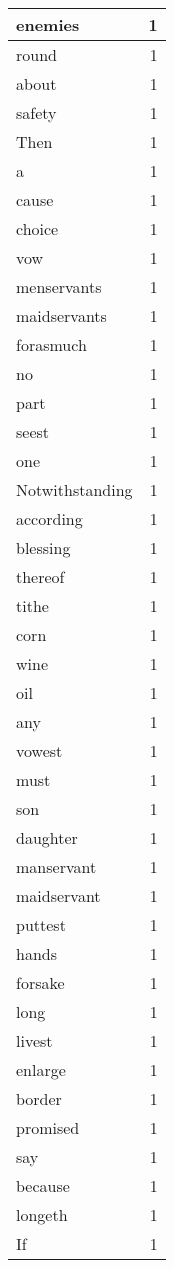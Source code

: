 \begin{center}
\begin{longtable}{l|r}
enemies & 1 \\ \hline
round & 1 \\ \hline
about & 1 \\ \hline
safety & 1 \\ \hline
Then & 1 \\ \hline
a & 1 \\ \hline
cause & 1 \\ \hline
choice & 1 \\ \hline
vow & 1 \\ \hline
menservants & 1 \\ \hline
maidservants & 1 \\ \hline
forasmuch & 1 \\ \hline
no & 1 \\ \hline
part & 1 \\ \hline
seest & 1 \\ \hline
one & 1 \\ \hline
Notwithstanding & 1 \\ \hline
according & 1 \\ \hline
blessing & 1 \\ \hline
thereof & 1 \\ \hline
tithe & 1 \\ \hline
corn & 1 \\ \hline
wine & 1 \\ \hline
oil & 1 \\ \hline
any & 1 \\ \hline
vowest & 1 \\ \hline
must & 1 \\ \hline
son & 1 \\ \hline
daughter & 1 \\ \hline
manservant & 1 \\ \hline
maidservant & 1 \\ \hline
puttest & 1 \\ \hline
hands & 1 \\ \hline
forsake & 1 \\ \hline
long & 1 \\ \hline
livest & 1 \\ \hline
enlarge & 1 \\ \hline
border & 1 \\ \hline
promised & 1 \\ \hline
say & 1 \\ \hline
because & 1 \\ \hline
longeth & 1 \\ \hline
If & 1 \\ \hline

\end{longtable}
\end{center}
